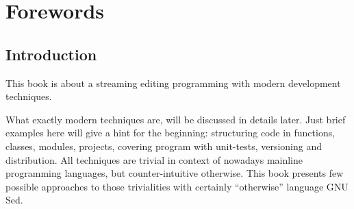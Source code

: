\chapter{Forewords}
\section{Introduction}
This book is about a streaming editing programming with modern development techniques.

What exactly modern techniques are, will be discussed in details later.
Just brief examples here will give a hint for the beginning:
structuring code in functions, classes, modules, projects,
covering program with unit-tests, versioning and distribution.
All techniques are trivial in context of
nowadays mainline programming languages,
but counter-intuitive otherwise.
This book presents few possible approaches to those trivialities
with certainly ``otherwise'' language \Emdash GNU Sed.

